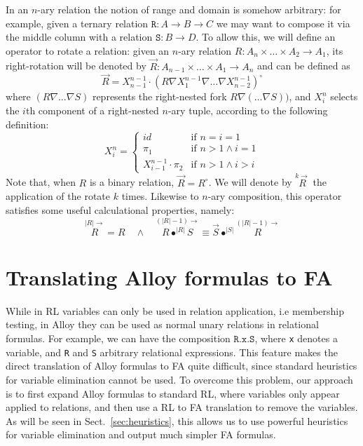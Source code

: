 \documentclass{llncs}
\begin{document}
\newcommand{\rotate}[1]{\overrightarrow{#1}}
\newcommand{\nrotate}[2]{\overset{#2 \rightarrow}{#1}}
In an $n$-ary relation the notion of range and domain is somehow arbitrary: for example, given a ternary relation $\mathtt{R} : A \rightarrow B \rightarrow C$ we may want to compose it via the middle column with a relation $\mathtt{S} : B \rightarrow D$. To allow this, we will define an operator to rotate a relation: given an $n$-ary relation $R : A_n \times \dots \times A_2 \rightarrow A_1$, its right-rotation will be denoted by $\rotate{R} : A_{n-1} \times \dots \times A_1 \rightarrow A_n$ and can be defined as
\begin{equation*}
\rotate{R} = X_{n-1}^{n -1} \cdot (R \nabla  X_1^{n - 1} \nabla \dots \nabla  X^{n - 1}_{n-2})^\circ 
\end{equation*}
where $(R \nabla \dots \nabla  S)$ represents the right-nested fork
$R \nabla (\dots \nabla S))$, and $X^n_i$ selects the $i$th component of a right-nested $n$-ary tuple, according to the following definition:
\begin{equation*} 
X^n_i = \left\{ \begin{array}{ll} 
id & \textrm{if } n = i = 1\\ 
\pi_1 & \textrm{if } n > 1 \wedge i = 1 \\
X^{n-1}_{i-1} \cdot \pi_2 & \textrm{if } n > 1 \wedge i > i 
\end{array} \right. 
\label{eq:defxi}
\end{equation*} 
Note that, when $R$ is a binary relation, $\rotate{R} = R^\circ$. We will denote by $\nrotate{R}{k}$ the application of the rotate $k$ times. Likewise to $n$-ary composition, this operator satisfies some useful calculational properties, namely:
\begin{equation*}
\nrotate{R}{|R|} = R \quad \wedge \quad \nrotate{R \bullet^{|R|} S}{(|R|-1)} \equiv \rotate{S} \bullet^{|S|} \nrotate{R}{(|R|-1)}
\end{equation*}

\section{Translating Alloy formulas to FA}
\label{sec:alloyforms}

While in RL variables can only be used in relation application, i.e
membership testing, in Alloy they can be used as normal unary
relations in relational formulas. For example, we can have the
composition $\mathtt{R . x . S}$, where \texttt{x} denotes a variable,
and \texttt{R} and \texttt{S} arbitrary relational expressions. This
feature makes the direct translation of Alloy formulas to FA quite
difficult, since standard heuristics for variable elimination cannot
be used. 
To overcome this problem, our approach is to first expand Alloy
formulas to standard RL, where variables only appear applied to
relations, and then use a RL to FA translation to remove the
variables. As will be seen in Sect.~\ref{sec:heuristics}, this allows
us to use powerful heuristics for variable elimination and output much
simpler FA formulas.
\end{document}
